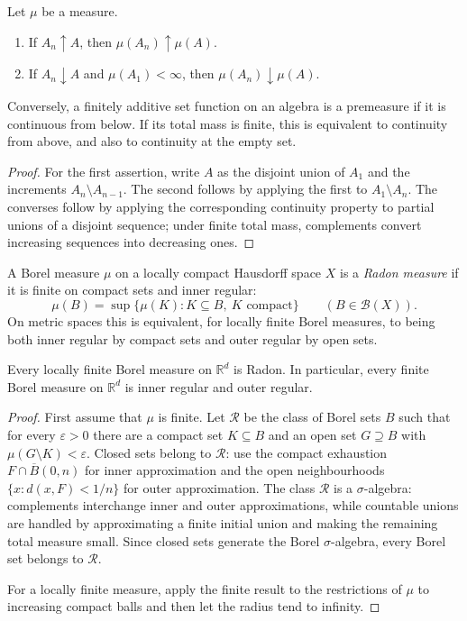 \begin{prop}
Let $\mu$ be a measure.
\begin{enumerate}[label=(\roman*)]
  \item If $A_n\uparrow A$, then $\mu(A_n)\uparrow\mu(A)$.
  \item If $A_n\downarrow A$ and $\mu(A_1)<\infty$, then
  $\mu(A_n)\downarrow\mu(A)$.
\end{enumerate}
Conversely, a finitely additive set function on an algebra is a premeasure if
it is continuous from below. If its total mass is finite, this is equivalent
to continuity from above, and also to continuity at the empty set.
\end{prop}

\begin{proof}
For the first assertion, write $A$ as the disjoint union of $A_1$ and the
increments $A_n\setminus A_{n-1}$. The second follows by applying the first to
$A_1\setminus A_n$. The converses follow by applying the corresponding
continuity property to partial unions of a disjoint sequence; under finite
total mass, complements convert increasing sequences into decreasing ones.
\end{proof}

\begin{de}
A Borel measure $\mu$ on a locally compact Hausdorff space $X$ is a
\emph{Radon measure} if it is finite on compact sets and inner regular:
\[
\mu(B)=\sup\{\mu(K):K\subseteq B,\ K\text{ compact}\}
\qquad(B\in\mathcal B(X)).
\]
On metric spaces this is equivalent, for locally finite Borel measures, to
being both inner regular by compact sets and outer regular by open sets.
\end{de}

\begin{thm}
Every locally finite Borel measure on $\mathbb R^d$ is Radon. In particular,
every finite Borel measure on $\mathbb R^d$ is inner regular and outer
regular.
\end{thm}

\begin{proof}
First assume that $\mu$ is finite. Let $\mathcal R$ be the class of Borel
sets $B$ such that for every $\varepsilon>0$ there are a compact set
$K\subseteq B$ and an open set $G\supseteq B$ with
$\mu(G\setminus K)<\varepsilon$. Closed sets belong to $\mathcal R$: use the
compact exhaustion $F\cap\overline B(0,n)$ for inner approximation and the
open neighbourhoods $\{x:d(x,F)<1/n\}$ for outer approximation. The class
$\mathcal R$ is a $\sigma$-algebra: complements interchange inner and outer
approximations, while countable unions are handled by approximating a finite
initial union and making the remaining total measure small. Since closed
sets generate the Borel $\sigma$-algebra, every Borel set belongs to
$\mathcal R$.

For a locally finite measure, apply the finite result to the restrictions of
$\mu$ to increasing compact balls and then let the radius tend to infinity.
\end{proof}

